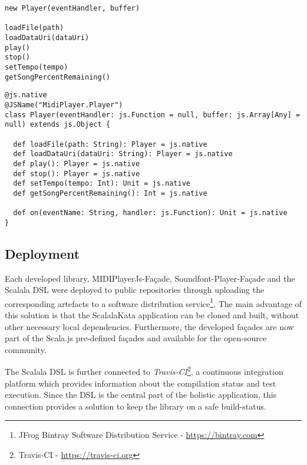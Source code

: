 \begin{lstlisting}[caption={MIDIPlayerJs \texttt{Player} API as native JavaScript}, label=LS_JS_SCALAJS_FACADE]
new Player(eventHandler, buffer)

loadFile(path)
loadDataUri(dataUri)
play()
stop()
setTempo(tempo)
getSongPercentRemaining()
\end{lstlisting}

\begin{lstlisting}[caption={Scala.js Façade for the MIDIPlayerJs class \texttt{Player}}, label=LS_SCALAJS_FACADE]
@js.native
@JSName("MidiPlayer.Player")
class Player(eventHandler: js.Function = null, buffer: js.Array[Any] = null) extends js.Object {

  def loadFile(path: String): Player = js.native
  def loadDataUri(dataUri: String): Player = js.native
  def play(): Player = js.native
  def stop(): Player = js.native
  def setTempo(tempo: Int): Unit = js.native
  def getSongPercentRemaining(): Int = js.native

  def on(eventName: String, handler: js.Function): Unit = js.native
}
\end{lstlisting}


\subsection{Deployment}
\label{IMPL_SCALALAKATA_DEPLOY}
Each developed library, MIDIPlayerJs-Façade, Soundfont-Player-Façade and the Scalala DSL were deployed to public repositories through uploading the corresponding artefacts to a software distribution service\footnote{JFrog Bintray Software Distribution Service - \url{https://bintray.com}}. The main advantage of this solution is that the ScalalaKata application can be cloned and built, without other necessary local dependencies. Furthermore, the developed façades are now part of the Scala.js pre-defined façades and available for the open-source community.

The Scalala DSL is further connected to \textit{Travis-CI}\footnote{Travis-CI - \url{https://travis-ci.org}}, a continuous integration platform which provides information about the compilation status and test execution. Since the DSL is the central part of the holistic application, this connection provides a solution to keep the library on a safe build-status.

